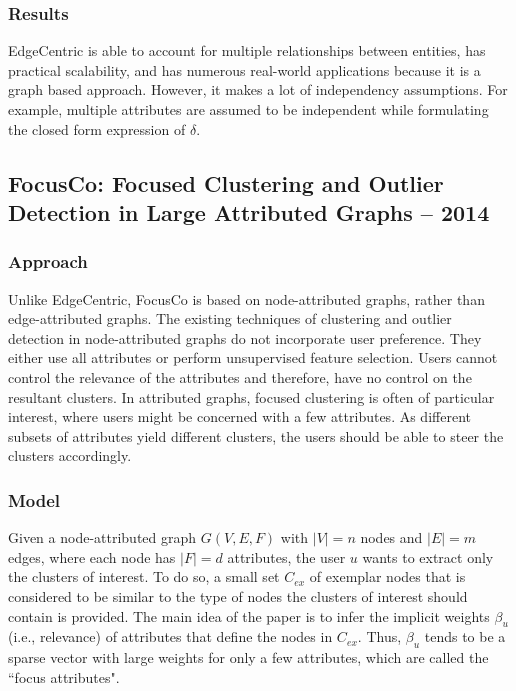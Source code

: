 \documentclass[11pt, oneside]{article}   	%
\begin{document}
\subsubsection*{Results}

\quad EdgeCentric is able to account for multiple relationships between entities, has practical scalability, and has numerous real-world applications because it is a graph based approach.
However, it makes a lot of independency assumptions.
For example, multiple attributes are assumed to be independent while formulating the closed form expression of $\delta$. 


\subsection*{FocusCo: Focused Clustering and Outlier Detection in Large Attributed Graphs -- 2014}

\subsubsection*{Approach}

\quad Unlike EdgeCentric, FocusCo is based on node-attributed graphs, rather than edge-attributed graphs.
The existing techniques of clustering and outlier detection in node-attributed graphs do not incorporate user preference.
They either use all attributes or perform unsupervised feature selection.
Users cannot control the relevance of the attributes and therefore, have no control on the resultant clusters.
In attributed graphs, focused clustering is often of particular interest, where users might be concerned with a few attributes. 
As different subsets of attributes yield different clusters, the users should be able to steer the clusters accordingly.

\subsubsection*{Model}

\quad Given a node-attributed graph $G(V,E,F)$ with $|V|=n$ nodes and $|E|=m$ edges, where each node has $|F| = d$ attributes, the user $u$ wants to extract only the clusters of interest.
To do so, a small set $C_{ex}$ of exemplar nodes that is considered to be similar to the type of nodes the clusters of interest should contain is provided.
The main idea of the paper is to infer the implicit weights $\beta_{u}$ (i.e., relevance) of attributes that define the nodes in $C_{ex}$.
Thus, $\beta_u$ tends to be a sparse vector with large weights for only a few attributes, which are called the ``focus attributes".
\end{document}
